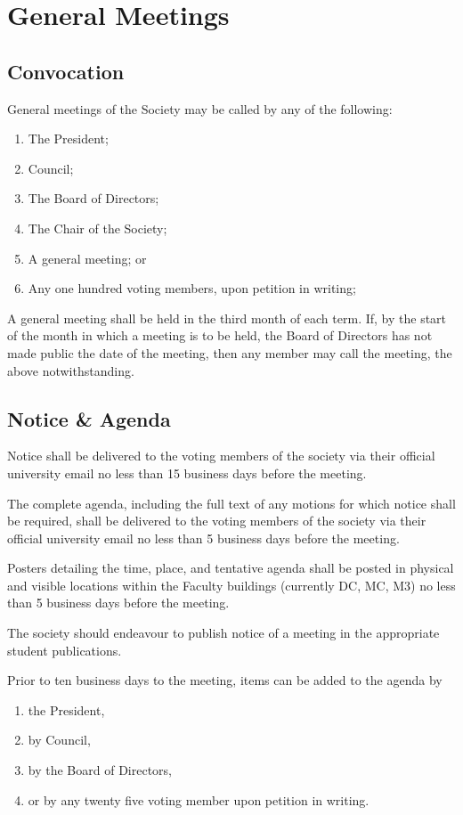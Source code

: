 \section{General Meetings}
\subsection{Convocation}
General meetings of the Society may be called by any of the following:
\begin{enumerate}
  \item The President;
  \item Council;
  \item The Board of Directors;
  \item The Chair of the Society;
  \item A general meeting; or
  \item Any one hundred voting members, upon petition in writing;
\end{enumerate}

A general meeting shall be held in the third month of each term. If, by the
start of the month in which a meeting is to be held, the Board of Directors has
not made public the date of the meeting, then any member may call the meeting,
the above notwithstanding.

\subsection{Notice \& Agenda}

Notice shall be delivered to the voting members of the society via their official university email no less than 15 business days before the meeting.

The complete agenda, including the full text of any motions for which notice shall be required, shall be delivered to the voting members of the society via their official university email no less than 5 business days before the meeting.

Posters detailing the time, place, and tentative agenda shall be posted in physical and visible locations within the Faculty buildings (currently DC, MC, M3) no less than 5 business days before the meeting.

The society should endeavour to publish notice of a meeting in the appropriate student publications.

Prior to ten business days to the meeting, items can be added to the agenda by
\begin{enumerate}
    \item the President, 
    \item by Council, 
    \item by the Board of Directors, 
    \item or by any twenty five voting member upon petition in writing.
\end{enumerate}

